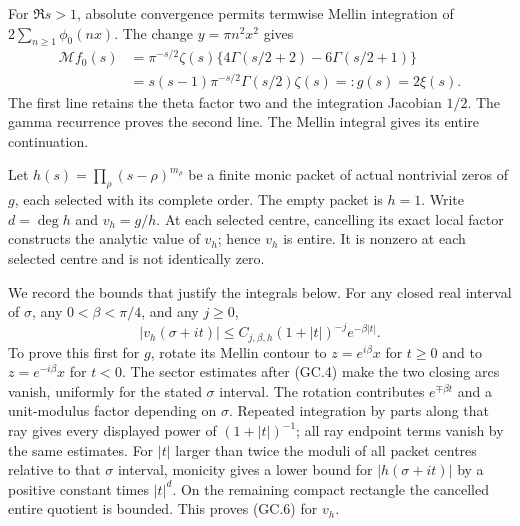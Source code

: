 For $\Re s>1$, absolute convergence permits termwise Mellin integration
of $2\sum_{n\ge1}\phi_0(nx)$. The change $y=\pi n^2x^2$ gives
\[
 \begin{split}
 \mathcal Mf_0(s)
 &=\pi^{-s/2}\zeta(s)
       \{4\Gamma(s/2+2)-6\Gamma(s/2+1)\}\\
 &=s(s-1)\pi^{-s/2}\Gamma(s/2)\zeta(s)=:g(s)=2\xi(s).
 \end{split}                                                   \tag{GC.5}
\]
The first line retains the theta factor two and the integration
Jacobian $1/2$. The gamma recurrence proves the second line. The
Mellin integral gives its entire continuation.

Let $h(s)=\prod_\rho(s-\rho)^{m_\rho}$ be a finite monic packet of
actual nontrivial zeros of $g$, each selected with its complete order.
The empty packet is $h=1$. Write $d=\deg h$ and $v_h=g/h$.
At each selected centre, cancelling its exact local factor constructs
the analytic value of $v_h$; hence $v_h$ is entire. It is nonzero at
each selected centre and is not identically zero.

We record the bounds that justify the integrals below. For any closed
real interval of $\sigma$, any $0<\beta<\pi/4$, and any $j\ge0$,
\[
 |v_h(\sigma+it)|\le C_{j,\beta,h}(1+|t|)^{-j}e^{-\beta|t|}.
                                                               \tag{GC.6}
\]
To prove this first for $g$, rotate its Mellin contour to
$z=e^{i\beta}x$ for $t\ge0$ and to $z=e^{-i\beta}x$ for $t<0$.
The sector estimates after (GC.4) make the two closing arcs vanish,
uniformly for the stated $\sigma$ interval. The rotation contributes
$e^{\mp\beta t}$ and a unit-modulus factor depending on $\sigma$.
Repeated integration by parts along that ray gives every displayed
power of $(1+|t|)^{-1}$; all ray endpoint terms vanish by the same
estimates. For $|t|$ larger than twice the moduli of all packet
centres relative to that $\sigma$ interval, monicity gives a lower
bound for $|h(\sigma+it)|$ by a positive constant times $|t|^d$.
On the remaining compact rectangle the cancelled entire quotient is
bounded. This proves (GC.6) for $v_h$.

